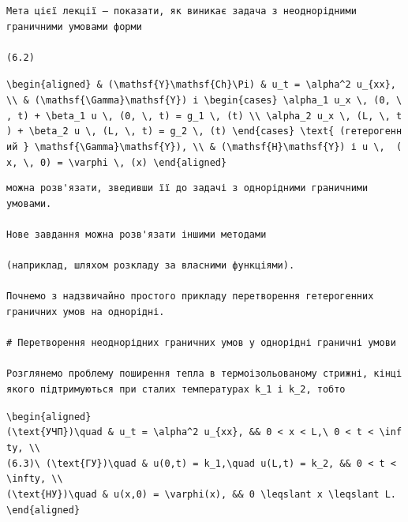 \documentclass[
  ukrainian,
]{article}
\begin{document}
\begin{verbatim}
Мета цієї лекції — показати, як виникає задача з неоднорідними граничними умовами форми

(6.2)
\end{verbatim}

\texttt{\textbackslash{}begin\{aligned\}\ \&\ (\textbackslash{}mathsf\{Y\}\textbackslash{}mathsf\{Ch\}\textbackslash{}Pi)\ \&\ u\_t\ =\ \textbackslash{}alpha\^{}2\ u\_\{xx\},\ \textbackslash{}\textbackslash{}\ \&\ (\textbackslash{}mathsf\{\textbackslash{}Gamma\}\textbackslash{}mathsf\{Y\})\ і\ \textbackslash{}begin\{cases\}\ \textbackslash{}alpha\_1\ u\_x\ \textbackslash{},\ (0,\ \textbackslash{},\ t)\ +\ \textbackslash{}beta\_1\ u\ \textbackslash{},\ (0,\ \textbackslash{},\ t)\ =\ g\_1\ \textbackslash{},\ (t)\ \textbackslash{}\textbackslash{}\ \textbackslash{}alpha\_2\ u\_x\ \textbackslash{},\ (L,\ \textbackslash{},\ t)\ +\ \textbackslash{}beta\_2\ u\ \textbackslash{},\ (L,\ \textbackslash{},\ t)\ =\ g\_2\ \textbackslash{},\ (t)\ \textbackslash{}end\{cases\}\ \textbackslash{}text\{\ (гетерогенний\ \}\ \textbackslash{}mathsf\{\textbackslash{}Gamma\}\textbackslash{}mathsf\{Y\}),\ \textbackslash{}\textbackslash{}\ \&\ (\textbackslash{}mathsf\{H\}\textbackslash{}mathsf\{Y\})\ і\ u\ \textbackslash{},\ \ (x,\ \textbackslash{},\ 0)\ =\ \textbackslash{}varphi\ \textbackslash{},\ (x)\ \textbackslash{}end\{aligned\}}

\begin{verbatim}
можна розв'язати, зведивши її до задачі з однорідними граничними умовами.

Нове завдання можна розв'язати іншими методами

(наприклад, шляхом розкладу за власними функціями).

Почнемо з надзвичайно простого прикладу перетворення гетерогенних граничних умов на однорідні.

# Перетворення неоднорідних граничних умов у однорідні граничні умови

Розглянемо проблему поширення тепла в термоізольованому стрижні, кінці якого підтримуються при сталих температурах k_1 і k_2, тобто
\end{verbatim}

\texttt{\textbackslash{}begin\{aligned\}}
\texttt{(\textbackslash{}text\{УЧП\})\textbackslash{}quad\ \&\ u\_t\ =\ \textbackslash{}alpha\^{}2\ u\_\{xx\},\ \&\&\ 0\ \textless{}\ x\ \textless{}\ L,\textbackslash{}\ 0\ \textless{}\ t\ \textless{}\ \textbackslash{}infty,\ \textbackslash{}\textbackslash{}}
\texttt{(6.3)\textbackslash{}\ (\textbackslash{}text\{ГУ\})\textbackslash{}quad\ \&\ u(0,t)\ =\ k\_1,\textbackslash{}quad\ u(L,t)\ =\ k\_2,\ \&\&\ 0\ \textless{}\ t\ \textless{}\ \textbackslash{}infty,\ \textbackslash{}\textbackslash{}}
\texttt{(\textbackslash{}text\{НУ\})\textbackslash{}quad\ \&\ u(x,0)\ =\ \textbackslash{}varphi(x),\ \&\&\ 0\ \textbackslash{}leqslant\ x\ \textbackslash{}leqslant\ L.}
\texttt{\textbackslash{}end\{aligned\}}
\end{document}
